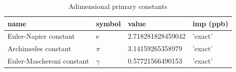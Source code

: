 \documentclass[a4paper,9pt]{article}
\begin{document}
\begin{appendix}





\listoftables{}   %
\listoffigures{}

\begin{table}
\caption{Adimensional primary constants}
\label{tab:1:table1}
  \hskip-2.5cm\begin{tabular}{llll}
    \toprule
    \cmidrule(r){1-4}
    name & symbol    & value & imp (ppb) \\
    \midrule
    
    Euler-Napier constant  & e    & 2.718281828459042 & 'exact' \\
    
    Archimedes constant & $\pi$    & 3.14159265358979 & 'exact' \\ 
    
    Euler-Mascheroni constant & $\gamma$    & 0.57721566490153 & 'exact' \\
    

\end{tabular}
\end{table}
\end{appendix}
\end{document}
